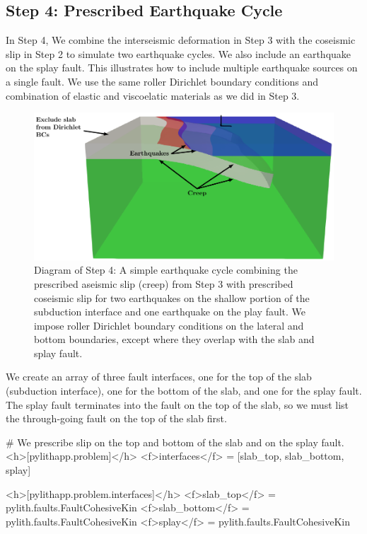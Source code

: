 \subsection{Step 4: Prescribed Earthquake Cycle}

In Step 4, We combine the interseismic deformation in Step 3 with the
coseismic slip in Step 2 to simulate two earthquake cycles. We also
include an earthquake on the splay fault. This illustrates how to
include multiple earthquake sources on a single fault. We use the same
roller Dirichlet boundary conditions and combination of elastic and
viscoelatic materials as we did in Step 3.

\begin{figure}[htbp]
  \includegraphics[scale=0.75]{examples/figs/subduction3d_step04_diagram}
  \caption{Diagram of Step 4: A simple earthquake cycle combining the
    prescribed aseismic slip (creep) from Step 3 with prescribed
    coseismic slip for two earthquakes on the shallow portion of the
    subduction interface and one earthquake on the play fault. We
    impose roller Dirichlet boundary conditions on the lateral and
    bottom boundaries, except where they overlap with the slab and
    splay fault.}
  \label{fig:example:subduction:3d:step04:diagram}
\end{figure}

We create an array of three fault interfaces, one for the top of the
slab (subduction interface), one for the bottom of the slab, and one
for the splay fault. The splay fault terminates into the fault on the
top of the slab, so we must list the through-going fault on the top of
the slab first.
\begin{cfg}
# We prescribe slip on the top and bottom of the slab and on the splay fault.
<h>[pylithapp.problem]</h>
<f>interfaces</f> = [slab_top, slab_bottom, splay]

<h>[pylithapp.problem.interfaces]</h>
<f>slab_top</f> = pylith.faults.FaultCohesiveKin
<f>slab_bottom</f> = pylith.faults.FaultCohesiveKin
<f>splay</f> = pylith.faults.FaultCohesiveKin
\end{cfg}

